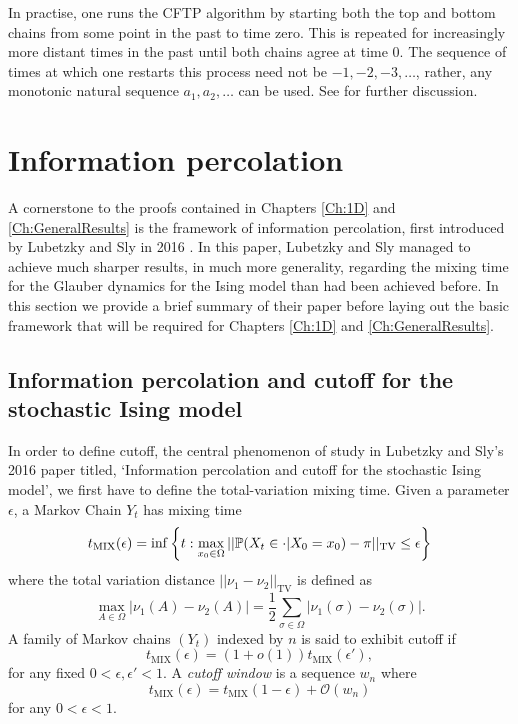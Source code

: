 	In practise, one runs the CFTP algorithm by starting both the top and bottom chains from some point in the past to time zero. This is repeated for increasingly more distant times in the past until both chains agree at time 0. The sequence of times at which one restarts this process need not be $-1, -2, -3, \dots$, rather, any monotonic natural sequence $a_1, a_2,\dots$ can  be used. See \cite{Levin2009-fo} \cite{Haggstrom2002-os} \cite{Jerrum1998-ph} for further discussion.

	
\section{Information percolation}
	A cornerstone to the proofs contained in Chapters \ref{Ch:1D} and \ref{Ch:GeneralResults} is the framework of information percolation, first introduced by Lubetzky and Sly in 2016 \cite{Lubetzky2016-wd}. In this paper, Lubetzky and Sly managed to achieve much sharper results, in much more generality, regarding the mixing time for the Glauber dynamics for the Ising model than had been achieved before. In this section we provide a brief summary of their paper before laying out the basic framework that will be required for Chapters \ref{Ch:1D} and \ref{Ch:GeneralResults}.

	\subsection{Information percolation and cutoff for the stochastic Ising model}
	In order to define cutoff, the central phenomenon of study in Lubetzky and Sly's 2016 paper titled, `Information percolation and cutoff for the stochastic Ising model', we first have to define the total-variation mixing time. Given a parameter $\epsilon$, a Markov Chain $Y_t$ has mixing time
	\begin{equation}
		t_\mathrm{MIX}(\epsilon) = \inf\left\{t: \max_{x_0 \in \Omega} ||\mathbb{P}(X_t \in \cdot | X_0 = x_0) - \pi ||_\mathrm{TV} \leq \epsilon \right\}
	\end{equation}
	where the total variation distance $||\nu_1 - \nu_2||_\mathrm{TV}$ is defined as 
	\begin{equation}
		\max_{A \in \Omega}|\nu_1(A) - \nu_2(A)| = \frac{1}{2}\sum_{\sigma \in \Omega} |\nu_1(\sigma) - \nu_2(\sigma)|.
	\end{equation}
	A family of Markov chains $(Y_t)$ indexed by $n$ is said to exhibit cutoff if
	\begin{equation}
		t_\mathrm{MIX}(\epsilon) = (1 + o(1)) t_\mathrm{MIX}(\epsilon'),
	\end{equation}
	for any fixed $0 < \epsilon, \epsilon' < 1$. A \emph{cutoff window} is a sequence $w_n$ where
	\begin{equation}
		t_\mathrm{MIX}(\epsilon) = t_\mathrm{MIX}(1 - \epsilon) + \mathcal{O}(w_n)
	\end{equation}
	for any $0 < \epsilon <1$.

